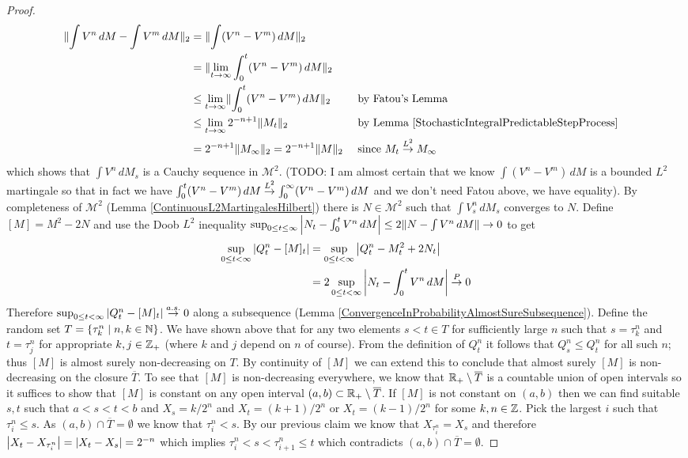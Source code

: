 \begin{proof}
\begin{align*}
\lVert \int V^n \, dM - \int V^m \, dM \rVert_2 &=\lVert \int (V^n - V^m )\, dM  \rVert_2 \\
&=\lVert \lim_{t \to \infty} \int_0^t (V^n - V^m )\, dM  \rVert_2\\
&\leq \lim_{t \to \infty} \lVert \int_0^t (V^n - V^m )\, dM  \rVert_2 && \text{ by Fatou's Lemma}\\
&\leq \lim_{t \to \infty} 2^{-n+1} \lVert M_t \rVert_2 && \text{ by Lemma \ref{StochasticIntegralPredictableStepProcess}}\\
&= 2^{-n + 1} \lVert M_\infty \rVert_2 = 2^{-n+1} \lVert M \rVert_2 && \text{ since $M_t \overset{L^2}\to M_\infty$}
\end{align*}
which shows that $\int V^n \, dM_s$ is a Cauchy sequence in $\mathcal{M}^2$.  (TODO: I am almost certain that we know $\int (V^n - V^m) \, dM$ is a bounded $L^2$ martingale so that in fact we have $\int_0^t (V^n - V^m) \, dM \overset{L^2}\to \int_0^\infty (V^n - V^m) \, dM$ and we don't need Fatou above, we have equality).  By completeness of $\mathcal{M}^2$ (Lemma \ref{ContinuousL2MartingalesHilbert}) there is $N \in \mathcal{M}^2$ such that $\int V_s^n \, dM_s$ converges to $N$.  Define $[M] = M^2 - 2N$ and use the Doob $L^2$ inequality $\sup_{0 \leq t \leq \infty} \left \vert N_t - \int_0^t V^n\, dM \right \vert \leq 2 \lVert N - \int V^n\, dM \rVert \to 0$ to get
\begin{align*}
\sup_{0 \leq t < \infty} \left \vert Q^n_t - [M]_t \right \vert &=\sup_{0 \leq t < \infty} \left \vert Q^n_t - M^2_t + 2N_t \right \vert \\
&= 2 \sup_{0 \leq t < \infty} \left \vert N_t - \int_0^t V^n \, dM \right \vert \overset{P}\to 0
\end{align*}
Therefore $\sup_{0 \leq t < \infty} \left \vert Q^n_t - [M]_t \right \vert \overset{a.s.}\to 0$ along a subsequence (Lemma \ref{ConvergenceInProbabilityAlmostSureSubsequence}).  Define the random set $T = \lbrace \tau^n_k \mid n,k \in \mathbb{N} \rbrace$.  We have shown above that for any two elements $s < t \in T$ for sufficiently large $n$ such that $s = \tau^n_k$ and $t = \tau^n_j$ for appropriate $k,j \in \mathbb{Z}_+$ (where $k$ and $j$ depend on $n$ of course).  From the definition of $Q^n_t$ it follows that $Q^n_s \leq Q^n_t$ for all such $n$; thus $[M]$ is almost surely non-decreasing on $T$.  By continuity of $[M]$ we can extend this to conclude that almost surely $[M]$ is non-decreasing on the closure $\overline{T}$.  To see that $[M]$ is non-decreasing everywhere, we know that $\mathbb{R}_+ \setminus \overline{T}$ is a countable union of open intervals so it suffices to show that $[M]$ is constant on any open interval $(a,b) \subset \mathbb{R}_+ \setminus \overline{T}$.  If $[M]$ is not constant on $(a,b)$ then we can find suitable $s,t$ such that $a < s < t < b$ and $X_s = k/2^n$ and $X_t = (k+1)/2^n$ or $X_t = (k-1)/2^n$ for some $k,n \in \mathbb{Z}$.  Pick the largest $i$ such that $\tau^n_i \leq s$.  As $(a,b) \cap \overline{T} = \emptyset$ we know that $\tau^n_i < s$.  By our previous claim we know that $X_{\tau^n_i} = X_s$ and therefore $\left \vert X_t - X_{\tau^n_i} \right \vert = \left \vert X_t - X_s \right \vert = 2^{-n}$ which implies $\tau^n_i < s < \tau^n_{i+1} \leq t$ which contradicts $(a,b) \cap \overline{T} = \emptyset$.


\end{proof}
